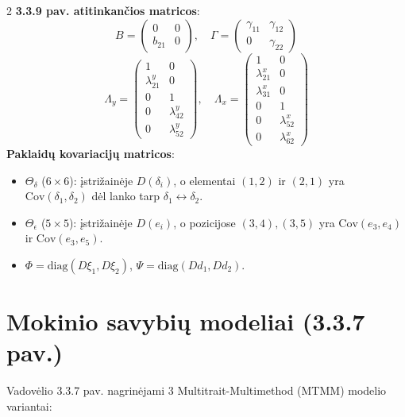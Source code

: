\documentclass[9pt,a4paper]{article}
\begin{document}
\begin{multicols*}{2}
\textbf{3.3.9 pav. atitinkančios matricos}:
\begin{equation*}
    B = \begin{pmatrix} 0 & 0 \\ b_{21} & 0 \end{pmatrix}, \quad \Gamma = \begin{pmatrix} \gamma_{11} & \gamma_{12} \\ 0 & \gamma_{22} \end{pmatrix}
\end{equation*}
\begin{equation*}
    \Lambda_y = \begin{pmatrix} 1 & 0 \\ \lambda_{21}^y & 0 \\ 0 & 1 \\ 0 & \lambda_{42}^y \\ 0 & \lambda_{52}^y \end{pmatrix}, \quad \Lambda_x = \begin{pmatrix} 1 & 0 \\ \lambda_{21}^x & 0 \\ \lambda_{31}^x & 0 \\ 0 & 1 \\ 0 & \lambda_{52}^x \\ 0 & \lambda_{62}^x \end{pmatrix}
\end{equation*}
\textbf{Paklaidų kovariacijų matricos}:
\begin{itemize}
    \item $\Theta_\delta$ ($6\times 6$): įstrižainėje $D(\delta_i)$, o elementai $(1,2)$ ir $(2,1)$ yra $\text{Cov}(\delta_1, \delta_2)$ dėl lanko tarp $\delta_1 \leftrightarrow \delta_2$.
    \item $\Theta_\epsilon$ ($5\times 5$): įstrižainėje $D(e_i)$, o pozicijose $(3,4), (3,5)$ yra $\text{Cov}(e_3, e_4)$ ir $\text{Cov}(e_3, e_5)$.
    \item $\Phi = \text{diag}(D\xi_1, D\xi_2)$, \quad $\Psi = \text{diag}(Dd_1, Dd_2)$.
\end{itemize}

\section{Mokinio savybių modeliai (3.3.7 pav.)}
Vadovėlio 3.3.7 pav. nagrinėjami 3 Multitrait-Multimethod (MTMM) modelio variantai:


\end{multicols*}
\end{document}
